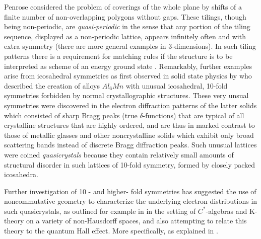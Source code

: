 \documentclass[12pt]{article}
\theoremstyle{plain}
\theoremstyle{definition}
\numberwithin{equation}{section}
\begin{document}
Penrose \cite{Penrose1} considered the problem of coverings of the whole plane by shifts of a finite number of non-overlapping polygons without gaps. These tilings, though being non-periodic, are \emph{quasi-periodic} in the sense that any portion of the tiling sequence, displayed as a non-periodic lattice, appears infinitely often and with extra symmetry (there are more general examples in 3-dimensions). In such tiling patterns there is a requirement for matching rules if the structure is to be interpreted as scheme of an energy ground state \cite{Radin}.
Remarkably, further examples arise from icosahedral symmetries as first observed in solid state physics by \cite{Schechtman} who described the creation of alloys ${Al}_6Mn$ with unusual icosahedral, 10-fold symmetries forbidden by normal crystallographic structures. These very unsual symmetries were discovered in the electron diffraction patterns of the latter solids which consisted of sharp Bragg peaks (true $\delta$-functions) that are typical of all crystalline structures that are highly ordered, and are thus in marked contrast to those of metallic glasses and other noncrystalline solids which exhibit only broad scattering bands instead of discrete Bragg diffraction peaks. Such unusual lattices were coined \emph{quasicrystals} because they contain relatively small amounts of structural disorder in such lattices of 10-fold symmetry, formed by closely packed icosahedra.

Further investigation of 10 - and higher- fold symmetries has suggested the use of noncommutative geometry to characterize the underlying electron distributions in such quasicrystals, as outlined for example in \cite{Bellissard1,Connes94} in the setting of $C^*$-algebras and K-theory on a variety of non-Hausdorff spaces, and also attempting to relate this theory to the quantum Hall effect. More specifically, as explained in \cite{Ypma1,Ypma2}.


\end{document}
